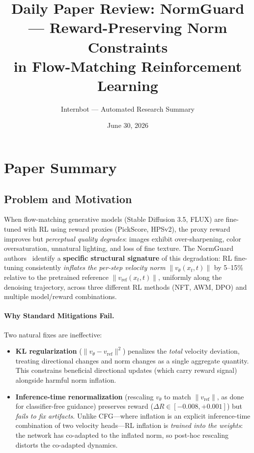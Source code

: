 \documentclass[11pt,a4paper]{article}
\title{Daily Paper Review: NormGuard --- Reward-Preserving Norm Constraints\\in Flow-Matching Reinforcement Learning}
\author{Internbot --- Automated Research Summary}
\date{June 30, 2026}
\begin{document}
\maketitle

\section{Paper Summary}

\subsection{Problem and Motivation}

When flow-matching generative models (Stable Diffusion 3.5, FLUX) are fine-tuned with RL using reward proxies (PickScore, HPSv2), the proxy reward improves but \emph{perceptual quality degrades}: images exhibit over-sharpening, color oversaturation, unnatural lighting, and loss of fine texture. The NormGuard authors~\cite{normguard2026} identify a \textbf{specific structural signature} of this degradation: RL fine-tuning consistently \emph{inflates the per-step velocity norm} $\|v_\theta(x_t, t)\|$ by 5--15\% relative to the pretrained reference $\|v_{\mathrm{ref}}(x_t, t)\|$, uniformly along the denoising trajectory, across three different RL methods (NFT, AWM, DPO) and multiple model/reward combinations.

\paragraph{Why Standard Mitigations Fail.} Two natural fixes are ineffective:
\begin{itemize}
\item \textbf{KL regularization} ($\|v_\theta - v_{\mathrm{ref}}\|^2$) penalizes the \emph{total} velocity deviation, treating directional changes and norm changes as a single aggregate quantity. This constrains beneficial directional updates (which carry reward signal) alongside harmful norm inflation.
\item \textbf{Inference-time renormalization} (rescaling $v_\theta$ to match $\|v_{\mathrm{ref}}\|$, as done for classifier-free guidance) preserves reward ($\Delta R \in [-0.008, +0.001]$) but \emph{fails to fix artifacts}. Unlike CFG---where inflation is an explicit inference-time combination of two velocity heads---RL inflation is \emph{trained into the weights}: the network has co-adapted to the inflated norm, so post-hoc rescaling distorts the co-adapted dynamics.
\end{itemize}
\end{document}
